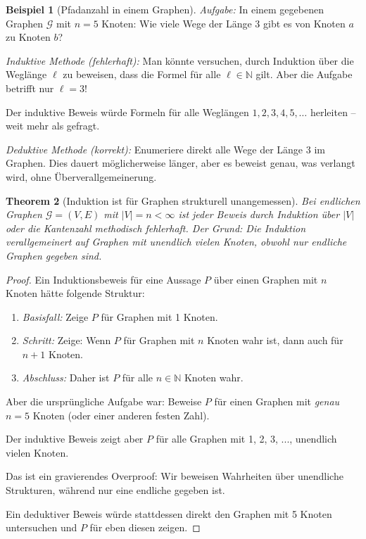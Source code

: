 \documentclass[12pt, a4paper]{article}
\newtheorem{theorem}{Theorem}[section]
\theoremstyle{definition}
\newtheorem{example}[theorem]{Beispiel}
\theoremstyle{remark}
\newcommand{\N}{\mathbb{N}}
\newcommand{\Graph}{\mathcal{G}}
\begin{document}
\begin{example}[Pfadanzahl in einem Graphen]
\label{ex:pfadanzahl}
\emph{Aufgabe:} In einem gegebenen Graphen $\Graph$ mit $n=5$ Knoten: Wie viele Wege der Länge 3 gibt es von Knoten $a$ zu Knoten $b$?

\emph{Induktive Methode (fehlerhaft):} 
Man könnte versuchen, durch Induktion über die Weglänge $\ell$ zu beweisen, dass die Formel für alle $\ell \in \N$ gilt. Aber die Aufgabe betrifft nur $\ell = 3$! 

Der induktive Beweis würde Formeln für alle Weglängen $1, 2, 3, 4, 5, \ldots$ herleiten -- weit mehr als gefragt.

\emph{Deduktive Methode (korrekt):}
Enumeriere direkt alle Wege der Länge 3 im Graphen. Dies dauert möglicherweise länger, aber es beweist genau, was verlangt wird, ohne Überverallgemeinerung.
\end{example}

\begin{theorem}[Induktion ist für Graphen strukturell unangemessen]
\label{thm:induktion_graphen_unangemessen}
Bei endlichen Graphen $\Graph = (V, E)$ mit $|V| = n < \infty$ ist jeder Beweis durch Induktion über $|V|$ oder die Kantenzahl methodisch fehlerhaft. Der Grund: Die Induktion verallgemeinert auf Graphen mit unendlich vielen Knoten, obwohl nur endliche Graphen gegeben sind.
\end{theorem}

\begin{proof}
Ein Induktionsbeweis für eine Aussage $P$ über einen Graphen mit $n$ Knoten hätte folgende Struktur:

\begin{enumerate}[label=(\roman*)]
  \item \emph{Basisfall:} Zeige $P$ für Graphen mit 1 Knoten.
  \item \emph{Schritt:} Zeige: Wenn $P$ für Graphen mit $n$ Knoten wahr ist, dann auch für $n+1$ Knoten.
  \item \emph{Abschluss:} Daher ist $P$ für alle $n \in \N$ Knoten wahr.
\end{enumerate}

Aber die ursprüngliche Aufgabe war: Beweise $P$ für einen Graphen mit \emph{genau} $n=5$ Knoten (oder einer anderen festen Zahl).

Der induktive Beweis zeigt aber $P$ für alle Graphen mit 1, 2, 3, ..., unendlich vielen Knoten.

Das ist ein gravierendes Overproof: Wir beweisen Wahrheiten über unendliche Strukturen, während nur eine endliche gegeben ist.

Ein deduktiver Beweis würde stattdessen direkt den Graphen mit 5 Knoten untersuchen und $P$ für eben diesen zeigen.
\end{proof}
\end{document}
